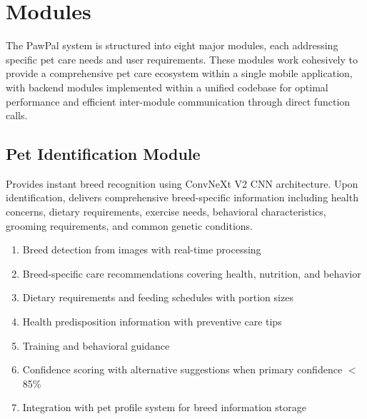 \section{Modules}

The PawPal system is structured into eight major modules, each addressing specific pet care needs and user requirements. These modules work cohesively to provide a comprehensive pet care ecosystem within a single mobile application, with backend modules implemented within a unified codebase for optimal performance and efficient inter-module communication through direct function calls.

\subsection{Pet Identification Module}
Provides instant breed recognition using ConvNeXt V2 CNN architecture. Upon identification, delivers comprehensive breed-specific information including health concerns, dietary requirements, exercise needs, behavioral characteristics, grooming requirements, and common genetic conditions.
\begin{enumerate}
    \item Breed detection from images with real-time processing
    \item Breed-specific care recommendations covering health, nutrition, and behavior
    \item Dietary requirements and feeding schedules with portion sizes
    \item Health predisposition information with preventive care tips
    \item Training and behavioral guidance
    \item Confidence scoring with alternative suggestions when primary confidence $<$85\%
    \item Integration with pet profile system for breed information storage
\end{enumerate}

